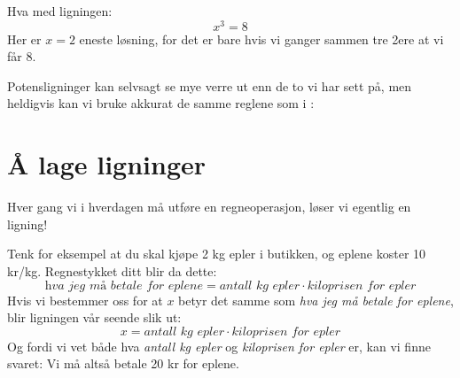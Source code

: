 Hva med ligningen:
\[ x^3 = 8\]
Her er $ {x=2} $ eneste løsning, for det er bare hvis vi ganger sammen tre 2ere at vi får 8.\vsk

Potensligninger kan selvsagt se mye verre ut enn de to vi har sett på, men heldigvis kan vi bruke akkurat de samme reglene som i :

\section{Å lage ligninger}
Hver gang vi i hverdagen må utføre en regneoperasjon, løser vi egentlig en ligning! \vsk

Tenk for eksempel at du skal kjøpe 2 kg epler i butikken, og eplene koster 10 kr/kg. Regnestykket ditt blir da dette:
\small
\[ \textit{hva jeg må betale for eplene}=\textit{antall kg epler}\cdot \textit{kiloprisen for epler} \]
\normalsize
Hvis vi bestemmer oss for at $ x $ betyr det samme som \textit{hva jeg må betale for eplene}, blir ligningen vår seende slik ut:
\[ x=\textit{antall kg epler}\cdot \textit{kiloprisen for epler} \]
Og fordi vi vet både hva \textit{antall kg epler} og \textit{kiloprisen for epler} er, kan vi finne svaret:\vs
{}
Vi må altså betale 20 kr for eplene. \vsk 


